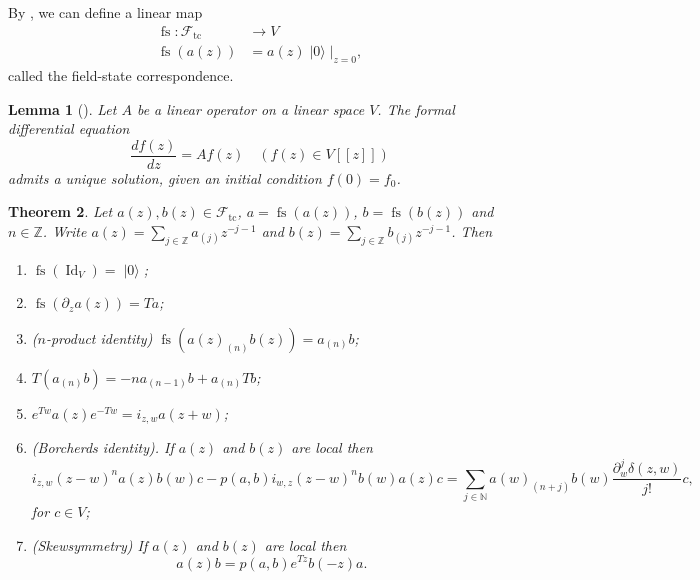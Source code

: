 \documentclass[a4paper, 12pt, reqno]{amsart}
\newtheorem{theorem}{Theorem}[subsection]
\newtheorem{lemma}[theorem]{Lemma}
\theoremstyle{remark}
\numberwithin{equation}{subsection}
\DeclareMathOperator{\Id}{Id}
\DeclareMathOperator{\vac}{|0\rangle}
\DeclareMathOperator{\fs}{fs}
\DeclareMathOperator{\tc}{tc}
\begin{document}
By , we can define a linear map
\begin{align*}
  \fs: \mathcal{F}_{\tc} &\to V \\
  \fs(a(z)) &= a(z)\vac|_{z = 0},
\end{align*}
called the field-state correspondence.

\begin{lemma}[{\cite[Proposition 4.3.2]{nozaradan_introduction_2008}}]
  \label{lmm:4}
  Let $A$ be a linear operator on a linear space $V$.
  The formal differential equation
  \begin{equation*}
    \frac{df(z)}{dz} = Af(z) \quad (f(z) \in V[[z]])
  \end{equation*}
  admits a unique solution, given an initial condition $f(0)=f_0$.
\end{lemma}

\begin{theorem}
  \label{thr:12}
  Let $a(z), b(z) \in \mathcal{F}_{\tc}$, $a = \fs(a(z))$, $b = \fs(b(z))$ and $n \in \mathbb{Z}$.
  Write $a(z) = \sum_{j \in \mathbb{Z}}a_{(j)}z^{-j - 1}$ and $b(z) = \sum_{j \in \mathbb{Z}}b_{(j)}z^{-j - 1}$.
  Then
  \begin{enumerate}
  \item $\fs(\Id_V) = \vac$;
  \item $\fs(\partial_za(z)) = Ta$;
  \item ($n$-product identity) $\fs(a(z)_{(n)}b(z)) = a_{(n)}b$;
  \item $T(a_{(n)}b) = -na_{(n - 1)}b + a_{(n)}Tb$;
  \item $e^{Tw}a(z)e^{-Tw} = i_{z, w}a(z + w)$;
  \item (Borcherds identity). If $a(z)$ and $b(z)$ are local then
    \begin{equation*}
      i_{z,w}(z-w)^na(z)b(w)c-p(a,b)i_{w,z}(z-w)^nb(w)a(z)c=\sum_{j\in \mathbb{N}}a(w)_{(n+j)}b(w)\frac{\partial^j_w\delta(z,w)}{j!}c,
    \end{equation*}
    for $c\in V$;
  \item (Skewsymmetry) If $a(z)$ and $b(z)$ are local then
    \begin{equation*}
      a(z)b=p(a,b)e^{Tz}b(-z)a.
    \end{equation*}
  \end{enumerate}
\end{theorem}
\end{document}
